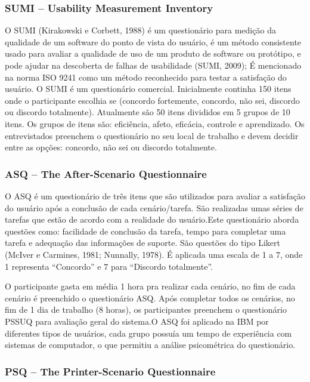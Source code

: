 \subsubsection{SUMI – Usability Measurement Inventory}

	O SUMI (Kirakowski e Corbett, 1988) é um questionário para medição da qualidade de um software do ponto de vista do usuário, é um método consistente usado para avaliar a qualidade de uso de um produto de software ou protótipo, e pode ajudar na descoberta de falhas de usabilidade (SUMI, 2009); É mencionado na norma ISO 9241 como um método reconhecido para testar a satisfação do usuário. O SUMI é um questionário comercial. 
	Inicialmente continha 150 itens onde o participante escolhia se (concordo fortemente, concordo, não sei, discordo ou discordo totalmente). Atualmente são 50 itens divididos em 5 grupos de 10 itens. Os grupos de itens são: eficiência, afeto, eficácia, controle e aprendizado. Os entrevistados preenchem o questionário no seu local de trabalho e devem decidir entre as opções: concordo, não sei ou discordo totalmente.

\subsubsection{ASQ – The After-Scenario Questionnaire}

O ASQ é um questionário de três itens que são utilizados para avaliar a satisfação do usuário após a conclusão de cada cenário/tarefa. São realizadas umas séries de tarefas que estão de acordo com a realidade do usuário.Este questionário aborda questões como: facilidade de conclusão da tarefa, tempo para completar uma tarefa e adequação das informações de suporte. São questões do tipo Likert (McIver e Carmines, 1981; Nunnally, 1978). É aplicada uma escala de 1 a 7, onde 1 representa “Concordo” e 7 para “Discordo totalmente”. ~\cite{lewis1995ibm}

O participante gasta em média 1 hora pra realizar cada cenário, no fim de cada cenário é preenchido o questionário ASQ. Após completar todos os cenários, no fim de 1 dia de trabalho (8 horas), os participantes preenchem o questionário PSSUQ para avaliação geral do sistema.O ASQ foi aplicado na IBM por diferentes tipos de usuários, cada grupo possuía um tempo de experiência com sistemas de computador, o que permitiu a análise psicométrica do questionário.


\subsubsection{PSQ – The Printer-Scenario Questionnaire}

